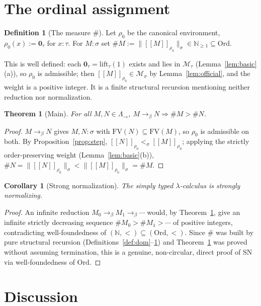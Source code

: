 \documentclass{amsart}
\newtheorem{theorem}{Theorem}
\newtheorem{corollary}{Corollary}
\theoremstyle{definition}
\newtheorem{definition}{Definition}
\newcommand{\Ord}{\mathrm{Ord}}
\newcommand{\interp}[1]{[\![#1]\!]}
\newcommand{\To}{\to_\beta}
\newcommand{\FV}{\mathrm{FV}}
\begin{document}
\section{The ordinal assignment}

\begin{definition}[The measure $\#$]\label{def:hash}
Let $\rho_0$ be the canonical environment, $\rho_0(x):=\mathbf 0_\tau$ for $x:\tau$. For
$M:\sigma$ set $\#M:=\|\interp{M}_{\rho_0}\|_\sigma\in\mathbb N_{\ge1}\subseteq\Ord$.
\end{definition}

This is well defined: each $\mathbf 0_\tau=\mathrm{lift}_\tau(1)$ exists and lies in
$\mathcal M_\tau$ (Lemma~\ref{lem:basic}(a)), so $\rho_0$ is admissible; then
$\interp{M}_{\rho_0}\in\mathcal M_\sigma$ by Lemma~\ref{lem:official}, and the weight is a
positive integer. It is a finite structural recursion mentioning neither reduction nor
normalization.

\begin{theorem}[Main]\label{thm:main}
For all $M,N\in\Lambda_\to$, $M\To N\Rightarrow\#M>\#N$.
\end{theorem}

\begin{proof}
$M\To N$ gives $M,N:\sigma$ with $\FV(N)\subseteq\FV(M)$, so $\rho_0$ is admissible on both.
By Proposition~\ref{prop:step}, $\interp{N}_{\rho_0}<_\sigma\interp{M}_{\rho_0}$; applying
the strictly order-preserving weight (Lemma~\ref{lem:basic}(b)),
$\#N=\|\interp{N}_{\rho_0}\|_\sigma<\|\interp{M}_{\rho_0}\|_\sigma=\#M$.
\end{proof}

\begin{corollary}[Strong normalization]\label{cor:SN}
The simply typed $\lambda$-calculus is strongly normalizing.
\end{corollary}

\begin{proof}
An infinite reduction $M_0\To M_1\To\cdots$ would, by Theorem~\ref{thm:main}, give an
infinite strictly decreasing sequence $\#M_0>\#M_1>\cdots$ of positive integers,
contradicting well-foundedness of $(\mathbb N,<)\subseteq(\Ord,<)$. Since $\#$ was built by
pure structural recursion (Definitions~\ref{def:dom}--\ref{def:hash}) and
Theorem~\ref{thm:main} was proved without assuming termination, this is a genuine,
non-circular, direct proof of SN via well-foundedness of $\Ord$.
\end{proof}

\section*{Discussion}
\end{document}
